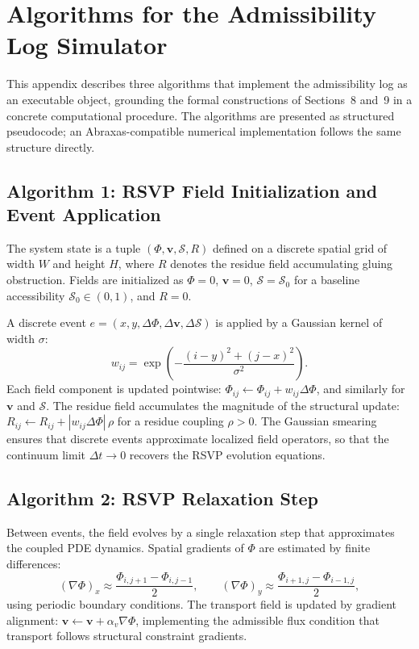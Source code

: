 \documentclass[11pt, a4paper, twocolumn]{article}
\newcommand{\Sfield}{\mathcal{S}}
\begin{document}
\appendix
{\small

\section{Algorithms for the Admissibility Log Simulator}

This appendix describes three algorithms that implement the admissibility log
as an executable object, grounding the formal constructions of Sections~8
and~9 in a concrete computational procedure. The algorithms are presented as
structured pseudocode; an Abraxas-compatible numerical implementation follows
the same structure directly.

\subsection{Algorithm 1: RSVP Field Initialization and Event Application}

The system state is a tuple $(\Phi, \mathbf{v}, \Sfield, R)$ defined on a
discrete spatial grid of width $W$ and height $H$, where $R$ denotes the
residue field accumulating gluing obstruction. Fields are initialized as
$\Phi = 0$, $\mathbf{v} = 0$, $\Sfield = \Sfield_0$ for a baseline
accessibility $\Sfield_0 \in (0,1)$, and $R = 0$.

A discrete event $e = (x,y,\Delta\Phi,\Delta\mathbf{v},\Delta\Sfield)$
is applied by a Gaussian kernel of width $\sigma$:
\[
    w_{ij} = \exp\!\left(-\frac{(i-y)^2 + (j-x)^2}{\sigma^2}\right).
\]
Each field component is updated pointwise:
$\Phi_{ij} \leftarrow \Phi_{ij} + w_{ij}\Delta\Phi$, and similarly for
$\mathbf{v}$ and $\Sfield$. The residue field accumulates the magnitude of
the structural update: $R_{ij} \leftarrow R_{ij} + |w_{ij}\Delta\Phi|\,\rho$
for a residue coupling $\rho > 0$. The Gaussian smearing ensures that discrete
events approximate localized field operators, so that the continuum limit
$\Delta t \to 0$ recovers the RSVP evolution equations.

\subsection{Algorithm 2: RSVP Relaxation Step}

Between events, the field evolves by a single relaxation step that approximates
the coupled PDE dynamics. Spatial gradients of $\Phi$ are estimated by
finite differences:
\[
    (\nabla\Phi)_x \approx \frac{\Phi_{i,j+1} - \Phi_{i,j-1}}{2},
    \qquad
    (\nabla\Phi)_y \approx \frac{\Phi_{i+1,j} - \Phi_{i-1,j}}{2},
\]
using periodic boundary conditions. The transport field is updated by gradient
alignment:
$\mathbf{v} \leftarrow \mathbf{v} + \alpha_v \nabla\Phi$, implementing the
admissible flux condition that transport follows structural constraint gradients.

}
\end{document}
